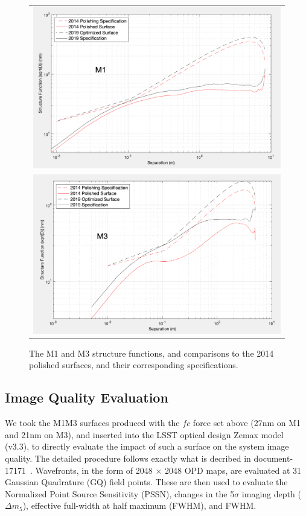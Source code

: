 \documentclass [twoside,openbib,12pt]{article}
\begin{document}
 \begin{figure}[bthp]
   \begin{center}
     \begin{tabular}{c}
\includegraphics[width=140mm]{figures/M1SF.png}\\
\includegraphics[width=140mm]{figures/M3SF.png}
  \end{tabular}
   \end{center}
   \caption
   { \label{fig:SF}
     The M1 and M3 structure functions, and comparisons to the 2014
     polished surfaces, and their corresponding specifications.
 }
\end{figure}

 \subsection{Image Quality Evaluation}

 We took the M1M3
 surfaces produced with the $fc$ force set above (27nm on M1 and
 21nm on M3), and inserted into the LSST optical design Zemax
 model (v3.3), to directly evaluate the impact of such a surface on
 the system image quality.
 The detailed procedure follows exactly what is decribed in
 document-17171~\cite{m1m3perf}.
 Wavefronts, in the form of 2048 $\times$ 2048 OPD maps, are evaluated
 at 31 Gaussian Quadrature (GQ) field points.
 These are then used to evaluate the Normalized Point Source
 Sensitivity (PSSN), changes in the 5$\sigma$ imaging depth ($\Delta
 m_5$), effective full-width at half maximum (FWHM), and FWHM.
\end{document}
